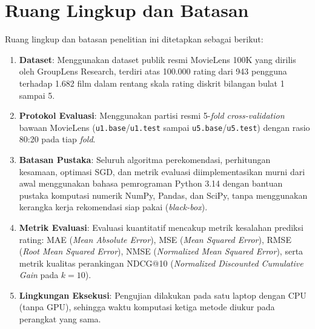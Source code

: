 \section{Ruang Lingkup dan Batasan}
Ruang lingkup dan batasan penelitian ini ditetapkan sebagai berikut:
\begin{enumerate}
    \item \textbf{Dataset}: Menggunakan dataset publik resmi MovieLens 100K yang dirilis oleh GroupLens Research, terdiri atas 100.000 rating dari 943 pengguna terhadap 1.682 film dalam rentang skala rating diskrit bilangan bulat 1 sampai 5.
    \item \textbf{Protokol Evaluasi}: Menggunakan partisi resmi 5-\textit{fold cross-validation} bawaan MovieLens (\texttt{u1.base}/\allowbreak\texttt{u1.test} sampai \texttt{u5.base}/\allowbreak\texttt{u5.test}) dengan rasio 80:20 pada tiap \textit{fold}.
    \item \textbf{Batasan Pustaka}: Seluruh algoritma perekomendasi, perhitungan kesamaan, optimasi SGD, dan metrik evaluasi diimplementasikan murni dari awal menggunakan bahasa pemrograman Python 3.14 dengan bantuan pustaka komputasi numerik NumPy, Pandas, dan SciPy, tanpa menggunakan kerangka kerja rekomendasi siap pakai (\textit{black-box}).
    \item \textbf{Metrik Evaluasi}: Evaluasi kuantitatif mencakup metrik kesalahan prediksi rating: MAE (\textit{Mean Absolute Error}), MSE (\textit{Mean Squared Error}), RMSE (\textit{Root Mean Squared Error}), NMSE (\textit{Normalized Mean Squared Error}), serta metrik kualitas perankingan NDCG@10 (\textit{Normalized Discounted Cumulative Gain} pada $k=10$).
    \item \textbf{Lingkungan Eksekusi}: Pengujian dilakukan pada satu laptop dengan CPU (tanpa GPU), sehingga waktu komputasi ketiga metode diukur pada perangkat yang sama.
\end{enumerate}

